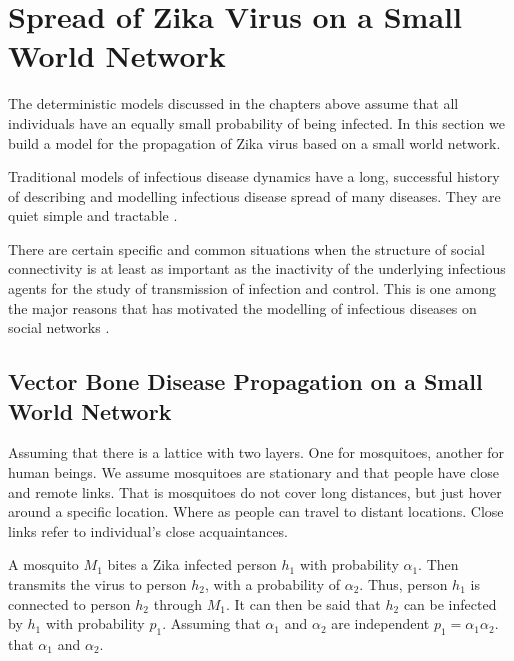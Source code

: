 \chapter{ Spread of Zika Virus on a Small World Network }

The deterministic models discussed in the chapters above assume that all individuals have an equally small probability of being infected. In this section we build a model for the propagation of Zika virus based on a small world network.

Traditional models of infectious disease dynamics have a long, successful history of describing and modelling infectious disease spread of many diseases. They are quiet simple and tractable \citep{fu2013propagation}.

There are certain specific and common situations when the structure of social connectivity is at least as important as the inactivity of the underlying infectious agents for the study of transmission of infection and control. This is one among the major reasons that has motivated the modelling of infectious diseases on social networks \cite{fu2013propagation}.



\section{ Vector Bone Disease Propagation on a Small World Network}
Assuming that there is a lattice with two layers. One for mosquitoes, another for human beings. We assume mosquitoes are stationary and that people have close and remote links. That is mosquitoes do not cover long distances, but just hover around a specific location. Where as people can travel to distant locations. Close links refer to individual's close acquaintances.
 
A mosquito $M_1$ bites a Zika infected person $h_1$ with probability $\alpha_1$. Then transmits the virus to person $h_2$, with a probability of $\alpha_2$. Thus, person $h_1$ is connected to  person $h_2$ through $M_1$. It can then be said that $h_2$ can be infected by $h_1$ with probability $p_1$. Assuming that $\alpha_1 $ and $\alpha_2$ are independent  $p_1 =  \alpha_1 \alpha_2$. 
that $\alpha_1$ and $\alpha_2$.

